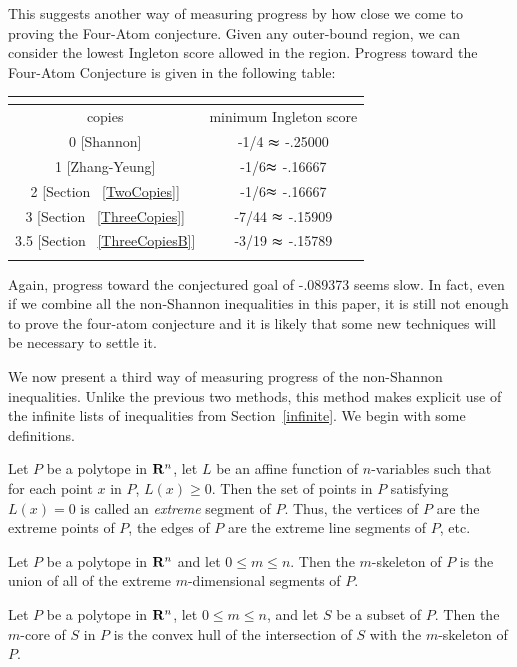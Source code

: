\documentclass[10pt,journal]{IEEEtran}
\begin{document}
This suggests another way of measuring progress by how close we come to proving the Four-Atom
conjecture.
Given any outer-bound region, we can consider the lowest Ingleton score allowed in the region.
Progress toward the Four-Atom Conjecture is given in the following table:

\begin{tabular}{|c|c|}
\multicolumn{2}{c}{}\\
  \hline
  copies  & minimum Ingleton score\\
   \hline
  0 [Shannon]& -1/4 $\thickapprox$ -.25000\\
  1 [Zhang-Yeung]& -1/6$\thickapprox$ -.16667\\
  2 [Section ~\ref{TwoCopies}]& -1/6$\thickapprox$ -.16667\\
  3 [Section ~\ref{ThreeCopies}]& -7/44 $\thickapprox$ -.15909\\
  3.5 [Section ~\ref{ThreeCopiesB}]& -3/19 $\thickapprox$ -.15789 \\
  \hline
  \multicolumn{2}{c}{}
\end{tabular}

Again, progress toward the conjectured goal of -.089373 seems slow.  In fact,
even if we combine all the non-Shannon inequalities in this paper, it is still not enough to
prove the four-atom conjecture and it is likely that some new techniques will be necessary to settle it.

We now present a third way of measuring progress of the non-Shannon inequalities.
Unlike the previous two methods, this method makes explicit use of the infinite lists of inequalities
from Section~\ref{infinite}.  We begin with some definitions.

\begin{definition}
Let $P$ be a polytope in $\mathbf{R}^{n}$, let $L$ be an affine function of $n$-variables such that
for each point $x$ in $P$, $L(x)\geq 0$.  Then the set of points in $P$ satisfying $L(x)=0$ is called
an {\em extreme} segment of $P$.  Thus, the vertices of $P$ are the extreme points of $P$, the
edges of $P$ are the extreme line segments of $P$, etc.
\end{definition}

\begin{definition}
Let $P$ be a polytope in $\mathbf{R}^{n}$ and let $0\leq m \leq n$.  Then the $m$-skeleton of $P$ is the
union of all of the extreme $m$-dimensional segments of $P$.
\end{definition}

\begin{definition}
Let $P$ be a polytope in $\mathbf{R}^{n}$, let $0\leq m \leq n$, and let $S$ be a subset of $P$.
Then the $m$-core of $S$ in $P$ is the convex hull of the intersection of $S$ with the $m$-skeleton of $P$.
\end{definition}
\end{document}
